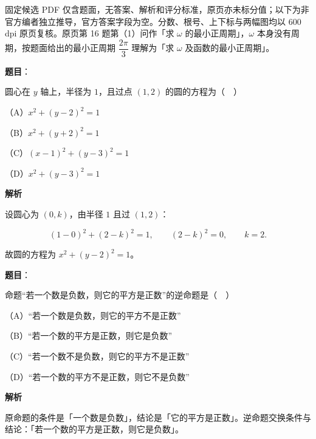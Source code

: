 

\begin{gktip}
固定候选 PDF 仅含题面，无答案、解析和评分标准，原页亦未标分值；以下为非官方编者独立推导，官方答案字段为空。分数、根号、上下标与两幅图均以 600 dpi 原页复核。原页第 16 题第（1）问作「求 $\omega$ 的最小正周期」，$\omega$ 本身没有周期，按题面给出的最小正周期 $\dfrac{2\pi}3$ 理解为「求 $\omega$ 及函数的最小正周期」。
\end{gktip}

\begin{answer}

\textbf{题目}：

圆心在 $y$ 轴上，半径为 $1$，且过点 $(1,2)$ 的圆的方程为（　）

（A）$x^2+(y-2)^2=1$

（B）$x^2+(y+2)^2=1$

（C）$(x-1)^2+(y-3)^2=1$

（D）$x^2+(y-3)^2=1$

\textbf{解析}

设圆心为 $(0,k)$，由半径 $1$ 且过 $(1,2)$：

\nopagebreak[4]
\[(1-0)^2+(2-k)^2=1,\qquad (2-k)^2=0,\qquad k=2.\]

故圆的方程为 $x^2+(y-2)^2=1$。


\end{answer}
\begin{answer}

\textbf{题目}：

命题“若一个数是负数，则它的平方是正数”的逆命题是（　）

（A）“若一个数是负数，则它的平方不是正数”

（B）“若一个数的平方是正数，则它是负数”

（C）“若一个数不是负数，则它的平方不是正数”

（D）“若一个数的平方不是正数，则它不是负数”

\textbf{解析}

原命题的条件是「一个数是负数」，结论是「它的平方是正数」。逆命题交换条件与结论：「若一个数的平方是正数，则它是负数」。


\end{answer}
